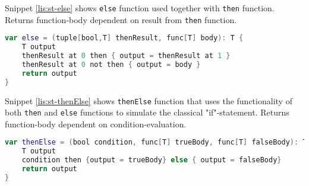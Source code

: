 Snippet \ref{lis:st-else} shows \texttt{else} function used together with \texttt{then} function. 
Returns function-body dependent on result from \texttt{then} function.
\begin{lstlisting}[language=Kotlin,label=lis:st-else,caption=\texttt{else} function.]
var else = (tuple[bool,T] thenResult, func[T] body): T {
	T output
	thenResult at 0 then { output = thenResult at 1 }
	thenResult at 0 not then { output = body }
	return output
}
\end{lstlisting}

Snippet \ref{lis:st-thenElse} shows \texttt{thenElse} function that uses the functionality of both \texttt{then} and \texttt{else} functions to simulate the classical "if"-statement. 
Returns function-body dependent on condition-evaluation. 
\begin{lstlisting}[language=Kotlin,label=lis:st-thenElse,caption=\texttt{thenElse} function.]
var thenElse = (bool condition, func[T] trueBody, func[T] falseBody): T {
	T output
	condition then {output = trueBody} else { output = falseBody}
	return output
}
\end{lstlisting}